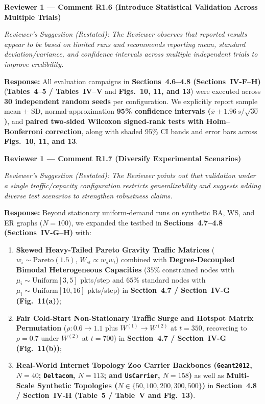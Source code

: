 \documentclass[11pt,a4paper]{article}
\newcommand{\cbox}[2]{%
  \vspace{0.6em}\noindent\textbf{#1}\par\smallskip
  \noindent\textit{Reviewer's Suggestion (Restated):} \textit{#2}\par\smallskip
}
\begin{document}
\hrulefill

\cbox{Reviewer 1 --- Comment R1.6 (Introduce Statistical Validation Across Multiple Trials)}{The Reviewer observes that reported results appear to be based on limited runs and recommends reporting mean, standard deviation/variance, and confidence intervals across multiple independent trials to improve credibility.}

\noindent\textbf{Response:} All evaluation campaigns in \textbf{Sections~4.6--4.8 (Sections~IV-F--H)} (\textbf{Tables~4--5 / Tables~IV--V} and \textbf{Figs.~10, 11, and 13}) were executed across \textbf{30 independent random seeds} per configuration. We explicitly report sample mean $\pm$ SD, normal-approximation \textbf{95\% confidence intervals ($\bar{x} \pm 1.96\,s/\sqrt{30}$)}, and \textbf{paired two-sided Wilcoxon signed-rank tests with Holm--Bonferroni correction}, along with shaded 95\% CI bands and error bars across \textbf{Figs.~10, 11, and 13}.

\hrulefill

\cbox{Reviewer 1 --- Comment R1.7 (Diversify Experimental Scenarios)}{The Reviewer points out that validation under a single traffic/capacity configuration restricts generalizability and suggests adding diverse test scenarios to strengthen robustness claims.}

\noindent\textbf{Response:} Beyond stationary uniform-demand runs on synthetic BA, WS, and ER graphs ($N=100$), we expanded the testbed in \textbf{Sections~4.7--4.8 (Sections~IV-G--H)} with:
\begin{enumerate}[leftmargin=1.8em]
    \item \textbf{Skewed Heavy-Tailed Pareto Gravity Traffic Matrices} ($w_i \sim \mathrm{Pareto}(1.5)$, $W_{st} \propto w_s w_t$) combined with \textbf{Degree-Decoupled Bimodal Heterogeneous Capacities} ($35\%$ constrained nodes with $\mu_i \sim \mathrm{Uniform}[3,5]$ pkts/step and $65\%$ standard nodes with $\mu_i \sim \mathrm{Uniform}[10,16]$ pkts/step) in \textbf{Section~4.7 / Section~IV-G (Fig.~11(a))};
    \item \textbf{Fair Cold-Start Non-Stationary Traffic Surge and Hotspot Matrix Permutation} ($\rho: 0.6 \to 1.1$ plus $W^{(1)}\to W^{(2)}$ at $t=350$, recovering to $\rho=0.7$ under $W^{(2)}$ at $t=700$) in \textbf{Section~4.7 / Section~IV-G (Fig.~11(b))};
    \item \textbf{Real-World Internet Topology Zoo Carrier Backbones (\texttt{Geant2012}, $N=40$; \texttt{Deltacom}, $N=113$; and \texttt{UsCarrier}, $N=158$)} as well as \textbf{Multi-Scale Synthetic Topologies ($N \in \{50, 100, 200, 300, 500\}$)} in \textbf{Section~4.8 / Section~IV-H (Table~5 / Table~V and Fig.~13)}.
\end{enumerate}
\end{document}
